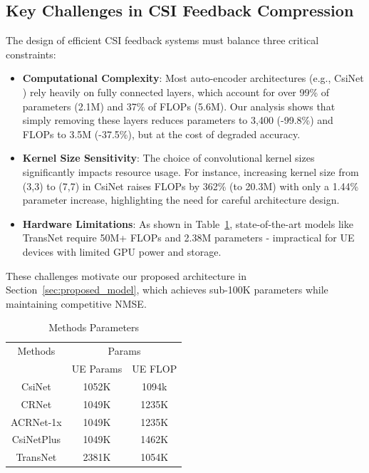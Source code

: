 \documentclass[lettersize,journal]{IEEEtran}
\begin{document}
\subsection{Key Challenges in CSI Feedback Compression}
The design of efficient CSI feedback systems must balance three critical constraints: 
\begin{itemize}
    \item \textbf{Computational Complexity}: Most auto-encoder architectures (e.g., CsiNet \cite{abe}) rely heavily on fully connected layers, which account for over 99\% of parameters (2.1M) and 37\% of FLOPs (5.6M). Our analysis shows that simply removing these layers reduces parameters to 3,400 (-99.8\%) and FLOPs to 3.5M (-37.5\%), but at the cost of degraded accuracy.
    
    \item \textbf{Kernel Size Sensitivity}: The choice of convolutional kernel sizes significantly impacts resource usage. For instance, increasing kernel size from (3,3) to (7,7) in CsiNet \cite{abe} raises FLOPs by 362\% (to 20.3M) with only a 1.44\% parameter increase, highlighting the need for careful architecture design.
    
    \item \textbf{Hardware Limitations}: As shown in Table~\ref{table:methods_params}, state-of-the-art models like TransNet \cite{abz} require 50M+ FLOPs and 2.38M parameters - impractical for UE devices with limited GPU power and storage.
\end{itemize}
These challenges motivate our proposed architecture in Section~\ref{sec:proposed_model}, which achieves sub-100K parameters while maintaining competitive NMSE.


\begin{table}[htb]
	\centering
	\caption{Methods Parameters}
	\label{table:methods_params}
	\begin{tabular}{ c|cc }
		\hline
		\multicolumn{1}{c|}{Methods}      & \multicolumn{2}{c}{Params}     \\
		& \multicolumn{1}{c}{UE Params}             & \multicolumn{1}{c}{UE FLOP} \\
		\hline
		CsiNet     & 1052K      & 1094k \\
		CRNet        & 1049K      & 1235K \\
		ACRNet-1x    & 1049K      & 1235K \\
		CsiNetPlus   & 1049K      & 1462K \\
		TransNet     & 2381K      & 1054K \\
		\hline
	\end{tabular}
\end{table}
\end{document}
